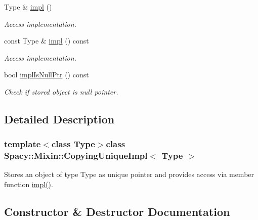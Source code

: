 \begin{DoxyCompactItemize}
\item 
\hypertarget{classSpacy_1_1Mixin_1_1CopyingUniqueImpl_ab7cc202fd000ba1753ef8596c09dc803}{}Type \& \hyperlink{classSpacy_1_1Mixin_1_1CopyingUniqueImpl_ab7cc202fd000ba1753ef8596c09dc803}{impl} ()\label{classSpacy_1_1Mixin_1_1CopyingUniqueImpl_ab7cc202fd000ba1753ef8596c09dc803}

\begin{DoxyCompactList}\small\item\em Access implementation. \end{DoxyCompactList}\item 
\hypertarget{classSpacy_1_1Mixin_1_1CopyingUniqueImpl_a6bdd26b4d36f442aa606a9e65d41c71c}{}const Type \& \hyperlink{classSpacy_1_1Mixin_1_1CopyingUniqueImpl_a6bdd26b4d36f442aa606a9e65d41c71c}{impl} () const \label{classSpacy_1_1Mixin_1_1CopyingUniqueImpl_a6bdd26b4d36f442aa606a9e65d41c71c}

\begin{DoxyCompactList}\small\item\em Access implementation. \end{DoxyCompactList}\item 
\hypertarget{classSpacy_1_1Mixin_1_1CopyingUniqueImpl_aaa5b34c44e72ae4fe0d7f283d67600d0}{}bool \hyperlink{classSpacy_1_1Mixin_1_1CopyingUniqueImpl_aaa5b34c44e72ae4fe0d7f283d67600d0}{impl\+Is\+Null\+Ptr} () const \label{classSpacy_1_1Mixin_1_1CopyingUniqueImpl_aaa5b34c44e72ae4fe0d7f283d67600d0}

\begin{DoxyCompactList}\small\item\em Check if stored object is null pointer. \end{DoxyCompactList}\end{DoxyCompactItemize}


\subsection{Detailed Description}
\subsubsection*{template$<$class Type$>$class Spacy\+::\+Mixin\+::\+Copying\+Unique\+Impl$<$ Type $>$}

Stores an object of type Type as unique pointer and provides access via member function \hyperlink{classSpacy_1_1Mixin_1_1CopyingUniqueImpl_ab7cc202fd000ba1753ef8596c09dc803}{impl()}. 

\subsection{Constructor \& Destructor Documentation}
\hypertarget{classSpacy_1_1Mixin_1_1CopyingUniqueImpl_aae94252db5d9b1b13ad62cbe2fcd6086_aae94252db5d9b1b13ad62cbe2fcd6086}{}
